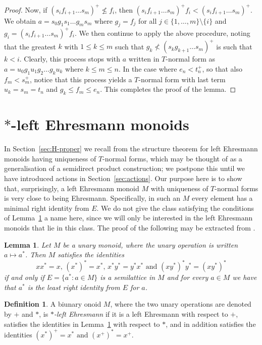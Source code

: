 \documentclass[12pt]{amsart}
\newtheorem{lem}[them]{Lemma}
\theoremstyle{definition}
\newtheorem{defn}[them]{Definition}
\theoremstyle{definition}
\numberwithin{them}{section}
\numberwithin{equation}{section}
\begin{document}
\begin{proof}
Now, if $(s_if_{i+1}\dots s_m)^+\not\leq f_i$,  then
$(s_if_{i+1}\dots s_m)^+ f_i<(s_if_{i+1}\dots s_m)^+ $. We obtain $a=s_0g_1s_1\dots g_ms_m$ where $g_j=f_j$ for all $j\in \{ 1,\dots ,m\}\setminus\{i\}$ and $g_i=(s_if_{i+1}\dots s_m)^+ f_i$. We then continue to apply the above procedure, noting that the greatest $k$ with $1\leq k\leq m$ such that   $g_k\not< (s_kg_{k+1}\dots s_m)^+$ is such that $k<i$. Clearly, this process stops with  $a$ written in $T$-normal form as 
$a=u_0g_1u_1g_2\dots g_ku_k$
 where $k\leq m \leq n$.  In the case where $e_n<t_n^+$, so that also $f_m<s_m^+$, notice that this process yields a $T$-normal form with last term $u_k=s_m=t_n$ and $g_k\leq f_m\leq e_n.$  This completes the proof of the lemma. \end{proof}

 \section{$*$-left Ehresmann monoids}\label{sec:*lE}

In Section~\ref{sec:H-proper} we  recall from \cite{GG}  the structure theorem for  left Ehresmann monoids  having 
uniqueness of $T$-normal forms, which may be thought of as a generalisation of a semidirect product construction; we postpone this until we have introduced actions in Section~\ref{sec:actions}.  Our purpose here is to show that, surprisingly, a left Ehresmann monoid $M$ with uniqueness of $T$-normal forms is very close to being Ehresmann.  Specifically, in such an $M$ 
every element has a minimal right identity from $E$. We do not give the class satisfying the conditions of Lemma~\ref{lem:wra} a name here, since we will only be interested in the left Ehresmann monoids that lie  in this class.  The proof of the following may be extracted from \cite[Corollary 3.12]{G}. 


\begin{lem} \label{lem:wra}
Let $M$ be a unary monoid, where the unary operation is written $a\mapsto a^*$. Then $M$ satisfies the identities
\[ xx^*=x, \, (x^*)^*=x^*,\, x^*y^*=y^*x^*\mbox{ and }(xy^*)^*y^*=(xy^*)^*  \]
if and only if  $E=\{ a^*:a\in M\}$ 
 is a semilattice in $M$ and for every $a\in M$ we have that $ a^*$ is  the least  right identity from $E$ for $a$.
\end{lem}

\begin{defn} \label{defn:starE}  A biunary onoid $M$, where the two unary operations are denoted by $+$ and $*$, is 
 $*${\em -left Ehresmann}  if it is a left Ehresmann with respect to  $+$, satisfies the identities in Lemma~\ref{lem:wra} with respect to $*$, and in addition satisfies the identities 
$(x^*)^+=x^*\mbox{ and }(x^+)^*=x^+$. 
\end{defn} 
\end{document}
